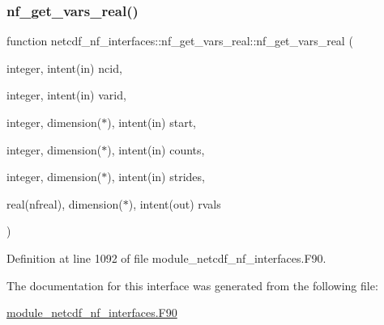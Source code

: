 \subsubsection{\texorpdfstring{nf\+\_\+get\+\_\+vars\+\_\+real()}{nf\_get\_vars\_real()}}
{\footnotesize\ttfamily function netcdf\+\_\+nf\+\_\+interfaces\+::nf\+\_\+get\+\_\+vars\+\_\+real\+::nf\+\_\+get\+\_\+vars\+\_\+real (\begin{DoxyParamCaption}\item[{integer, intent(in)}]{ncid,  }\item[{integer, intent(in)}]{varid,  }\item[{integer, dimension($\ast$), intent(in)}]{start,  }\item[{integer, dimension($\ast$), intent(in)}]{counts,  }\item[{integer, dimension($\ast$), intent(in)}]{strides,  }\item[{real(nfreal), dimension($\ast$), intent(out)}]{rvals }\end{DoxyParamCaption})}



Definition at line 1092 of file module\+\_\+netcdf\+\_\+nf\+\_\+interfaces.\+F90.



The documentation for this interface was generated from the following file\+:\begin{DoxyCompactItemize}
\item 
\hyperlink{module__netcdf__nf__interfaces_8F90}{module\+\_\+netcdf\+\_\+nf\+\_\+interfaces.\+F90}\end{DoxyCompactItemize}
